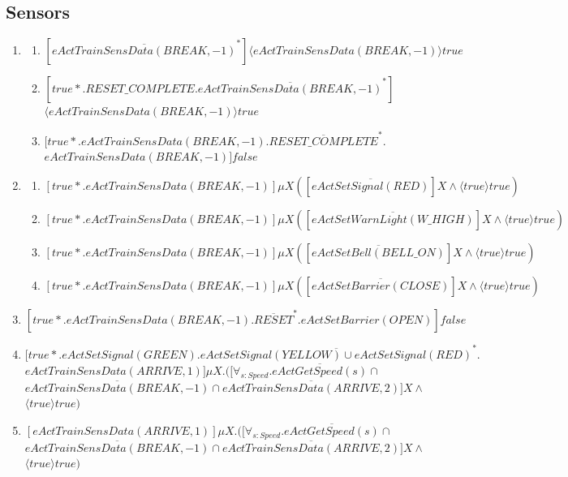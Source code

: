 \documentclass[10pt,a4paper]{article}
\begin{document}
\subsection{Sensors}
\begin{enumerate}
\item 
	\begin{enumerate}
    \item $[\overline{eActTrainSensData(BREAK,-1)}^*]\langle eActTrainSensData(BREAK,-1) \rangle true$
    \item $[true*.RESET\_COMPLETE.\overline{eActTrainSensData(BREAK,-1)}^*] $\\$ \langle eActTrainSensData(BREAK,-1) \rangle true $
    \item $[true*.eActTrainSensData(BREAK,-1).\overline{RESET\_COMPLETE}^*. $\\$ eActTrainSensData(BREAK,-1)]false$
    \end{enumerate}
\item
	\begin{enumerate}
    \item $[true*.eActTrainSensData(BREAK,-1)]\mu X([\overline{eActSetSignal(RED)}]X \wedge \langle true\rangle  true)$
    \item $[true*.eActTrainSensData(BREAK,-1)]\mu X([\overline{eActSetWarnLight(W\_HIGH)}]X \wedge \langle true\rangle  true)$
    \item $[true*.eActTrainSensData(BREAK,-1)]\mu X([\overline{eActSetBell(BELL\_ON)}]X \wedge \langle true\rangle  true)$
    \item $[true*.eActTrainSensData(BREAK,-1)]\mu X([\overline{eActSetBarrier(CLOSE)}]X \wedge \langle true\rangle  true)$
    \end{enumerate}
\item $[true*.eActTrainSensData(BREAK,-1).\overline{RESET}^*.eActSetBarrier(OPEN)]false$
\item $[true*.eActSetSignal(GREEN).\overline{eActSetSignal(YELLOW) \cup eActSetSignal(RED)}^*. $\\$ eActTrainSensData(ARRIVE,1)]\mu X.([\forall _{s:Speed}.\overline{eActGetSpeed(s) } \cap  $\\$  \overline{ eActTrainSensData(BREAK,-1) } \cap \overline{ eActTrainSensData(ARRIVE,2) }]X \wedge  $\\$  \langle true \rangle true )$
\item $[eActTrainSensData(ARRIVE,1)]\mu X.([\forall _{s:Speed}.\overline{eActGetSpeed(s) } \cap  $\\$  \overline{ eActTrainSensData(BREAK,-1) } \cap \overline{eActTrainSensData(ARRIVE,2)}]X \wedge  $\\$ \langle true \rangle true )$
\end{enumerate}
\end{document}
